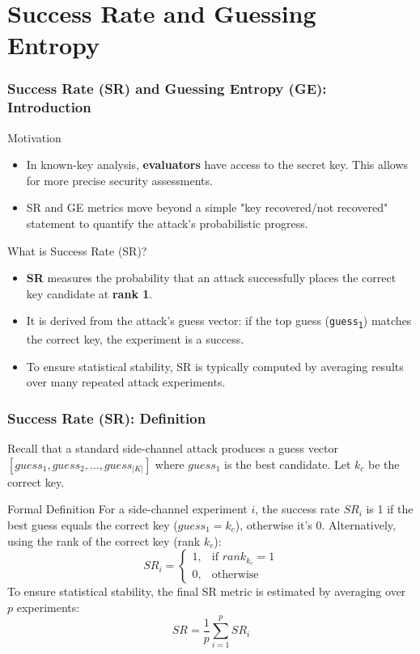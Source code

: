 \section{Success Rate and Guessing Entropy}


\begin{frame}
    \frametitle{Success Rate (SR) and Guessing Entropy (GE): Introduction}
    
    \begin{block}{Motivation}
        \begin{itemize}
            \item In known-key analysis, \textbf{evaluators} have access to the secret key. This allows for more precise security assessments.
            \item SR and GE metrics move beyond a simple "key recovered/not recovered" statement to quantify the attack's probabilistic progress.
        \end{itemize}
    \end{block}
    
    \begin{block}{What is Success Rate (SR)?}
        \begin{itemize}
            \item \textbf{SR} measures the probability that an attack successfully places the correct key candidate at \textbf{rank 1}.
            \item It is derived from the attack's guess vector: if the top guess (\texttt{guess\textsubscript{1}}) matches the correct key, the experiment is a success.
            \item To ensure statistical stability, SR is typically computed by averaging results over many repeated attack experiments.
        \end{itemize}
    \end{block}
\end{frame}


\begin{frame}
    \frametitle{Success Rate (SR): Definition}
    
        Recall that a standard side-channel attack produces a guess vector $[guess_1, guess_2, \dots, guess_{|K|}]$ where $guess_1$ is the best candidate. \newline
        Let $k_c$ be the correct key.    
    \begin{block}{Formal Definition}
        For a side-channel experiment $i$, the success rate $SR_i$ is 1 if the best guess equals the correct key ($guess_1 = k_c$), otherwise it's 0.
        Alternatively, using the rank of the correct key (rank $k_c$):
        $$ SR_i = \begin{cases} 1, & \text{if } rank_{k_c} = 1 \\ 0, & \text{otherwise} \end{cases} $$
        To ensure statistical stability, the final SR metric is estimated by averaging over $p$ experiments:
        $$ SR = \frac{1}{p} \sum_{i=1}^{p} SR_i $$
    \end{block}
\end{frame}


